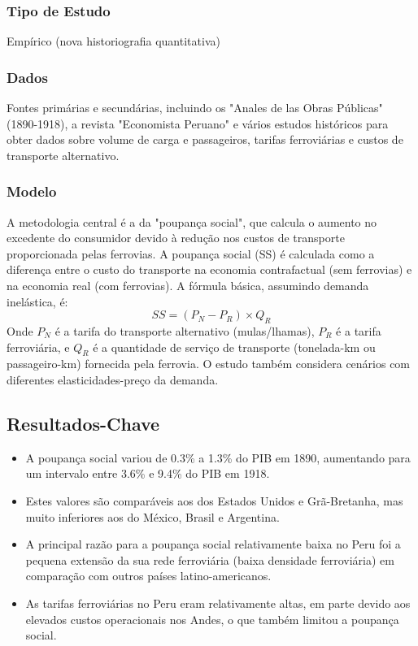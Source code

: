 \documentclass[12pt]{article}
\begin{document}
\subsubsection*{Tipo de Estudo}
Empírico (nova historiografia quantitativa)

\subsubsection*{Dados}
Fontes primárias e secundárias, incluindo os "Anales de las Obras Públicas" (1890-1918), a revista "Economista Peruano" e vários estudos históricos para obter dados sobre volume de carga e passageiros, tarifas ferroviárias e custos de transporte alternativo.

\subsubsection*{Modelo}
A metodologia central é a da "poupança social", que calcula o aumento no excedente do consumidor devido à redução nos custos de transporte proporcionada pelas ferrovias. A poupança social (SS) é calculada como a diferença entre o custo do transporte na economia contrafactual (sem ferrovias) e na economia real (com ferrovias). A fórmula básica, assumindo demanda inelástica, é:
\begin{equation*}
SS = (P_N - P_R) \times Q_R
\end{equation*}
Onde $P_N$ é a tarifa do transporte alternativo (mulas/lhamas), $P_R$ é a tarifa ferroviária, e $Q_R$ é a quantidade de serviço de transporte (tonelada-km ou passageiro-km) fornecida pela ferrovia. O estudo também considera cenários com diferentes elasticidades-preço da demanda.

\subsection*{Resultados-Chave}
\begin{itemize}
    \item A poupança social variou de 0.3\% a 1.3\% do PIB em 1890, aumentando para um intervalo entre 3.6\% e 9.4\% do PIB em 1918.
    \item Estes valores são comparáveis aos dos Estados Unidos e Grã-Bretanha, mas muito inferiores aos do México, Brasil e Argentina.
    \item A principal razão para a poupança social relativamente baixa no Peru foi a pequena extensão da sua rede ferroviária (baixa densidade ferroviária) em comparação com outros países latino-americanos.
    \item As tarifas ferroviárias no Peru eram relativamente altas, em parte devido aos elevados custos operacionais nos Andes, o que também limitou a poupança social.
\end{itemize}
\end{document}
